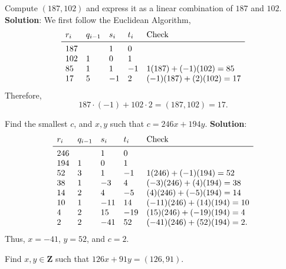 \begin{Exercise}{}{}
    Compute $ (187,102) $ and express it as a linear combination of $ 187 $ and $ 102 $.
    \tcblower{}
    \textbf{Solution}: We first follow the Euclidean Algorithm,
    \[ \begin{array}{lllll}
            r_i & q_{i-1} & s_i & t_i & \text{Check}          \\
            \midrule
            187 &         & 1   & 0                           \\
            102 & 1       & 0   & 1                           \\
            85  & 1       & 1   & -1  & 1(187)+(-1)(102)=85   \\
            17  & 5       & -1  & 2   & (-1)(187)+(2)(102)=17
        \end{array} \]
    Therefore,
    \[ 187\cdot (-1)+102\cdot 2=(187,102)=17. \]
\end{Exercise}
\begin{Exercise}{}{}
    Find the smallest $ c $, and $ x,y $ such that $ c=246x+194y $.
    \tcblower{}
    \textbf{Solution}:
    \[ \begin{array}{lllll}
            r_i & q_{i-1} & s_i & t_i & \text{Check}            \\
            \midrule
            246 &         & 1   & 0                             \\
            194 & 1       & 0   & 1                             \\
            52  & 3       & 1   & -1  & 1(246)+(-1)(194)=52     \\
            38  & 1       & -3  & 4   & (-3)(246)+(4)(194)=38   \\
            14  & 2       & 4   & -5  & (4)(246)+(-5)(194)=14   \\
            10  & 1       & -11 & 14  & (-11)(246)+(14)(194)=10 \\
            4   & 2       & 15  & -19 & (15)(246)+(-19)(194)=4  \\
            2   & 2       & -41 & 52  & (-41)(246)+(52)(194)=2.
        \end{array} \]
    Thus, $ x=-41 $, $ y=52 $, and $ c=2 $.
\end{Exercise}
\begin{Exercise}{}{}
    Find $ x,y\in\mathbf{Z} $ such that $ 126x+91y=(126,91) $.
\end{Exercise}
